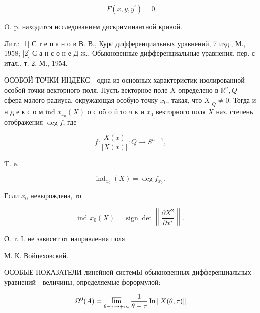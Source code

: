 \documentclass[10pt]{article}
\begin{document}
\[

F\left(x, y, y^{\prime}\right)=0

\]



O. p. находится исследованием дискриминантной кривой.



Лит.: [1] С т е п а н о в В. В., Курс дифференциальных уравнений, 7 изд., М., 1958; [2] С а н с о н е Д ж., Обыкновенные дифференциальные уравнения, пер. с итал., т. 2, М., 1954.



ОСОБОЙ ТОЧКИ ИНДЕКС - одна из основных характеристик изолированной особой точки векторного поля. Пусть векторное поле $X$ определено в $\mathbb{R}^{n}, Q-$ сфера малого радиуса, окружающая особую точку $x_{0}$, такая, что $\left.X\right|_{Q} \neq 0$. Тогда и н д е к с о м ind $x_{x_{0}}(X)$ о с об о й то ч к и $x_{0}$ векторного поля $X$ наз. степень отображения $\operatorname{deg} f$, где



\[

f: \frac{X(x)}{|X(x)|}: Q \rightarrow S^{n-1},

\]



T. e.



\[

\operatorname{ind}_{x_{0}}(X)=\operatorname{deg} f_{x_{0}} \text {. }

\]



Если $x_{0}$ невырождена, то



\[

\text { ind } x_{0}(X)=\operatorname{sign} \operatorname{det}\left\|\frac{\partial X^{2}}{\partial x^{i}}\right\| \text {. }

\]



О. т. І. не зависит от направления поля.



М. К. Войцеховский.



ОСОБЫЕ ПОКАЗАТЕЛИ линейной системЫ обыкновенных дифференциальных уравнений - величины, определяемые форормулой:



\[

\Omega^{0}(A)=\varlimsup_{\theta-\tau \rightarrow+\infty} \frac{1}{\theta-\tau} \operatorname{In}\|X(\theta, \tau)\|

\]
\end{document}
